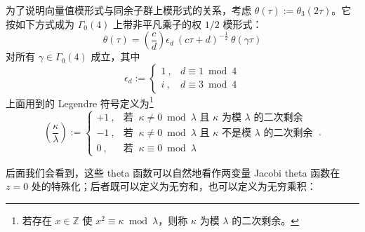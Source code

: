 \documentclass[11pt,a4paper,fontset=windows]{ctexart}
\numberwithin{equation}{section}
\newcommand{\SL}{\operatorname{\textsl{SL}}}      %
\newcommand{\Z}{\mathbb{Z}}
\def\t{\tau}
\newcommand{\ex}{\operatorname{e}} %
\newcommand{\be}{\begin{equation}}
\newcommand{\ee}{\end{equation}}
\begin{document}

为了说明向量值模形式与同余子群上模形式的关系，考虑 $\theta(\tau) := \theta_3(2\tau)$。它按如下方式成为 $\Gamma_0(4)$ 上带非平凡乘子的权 $1/2$ 模形式：
\be
\theta(\tau)  = \left(\frac{c}{d}\right) \epsilon_d ~ (c\t+d)^{-\frac{1}{2}} ~  \theta(\gamma\tau)  
\ee
对所有 $\gamma\in\Gamma_0(4)$ 成立，其中
\[ 
\epsilon_d:=\left\lbrace\begin{array}{rl} 1~, & d\equiv1\bmod4 \\ i~, & d\equiv3\bmod4 \end{array} \right.
\]
上面用到的 Legendre 符号定义为\footnote{若存在 $x\in\mathbb{Z}$ 使 $x^2\equiv\kappa\bmod\lambda$，则称 $\kappa$ 为模 $\lambda$ 的二次剩余。}
\[
\left(\frac{\kappa}{\lambda}\right):=\left\lbrace\begin{array}{rl} +1~, & \text{若~}~\kappa\neq0\bmod\lambda\text{ 且 $\kappa$ 为模 $\lambda$ 的二次剩余} \\ -1~, & \text{若~}~\kappa\neq0\bmod\lambda\text{ 且 $\kappa$ 不是模 $\lambda$ 的二次剩余} \\ 0~, & \text{若~}~\kappa\equiv0\bmod\lambda\end{array}\right.~.
\]


后面我们会看到，这些 theta 函数可以自然地看作两变量 Jacobi theta 函数在 $z=0$ 处的特殊化；后者既可以定义为无穷和，也可以定义为无穷乘积：

\end{document}
